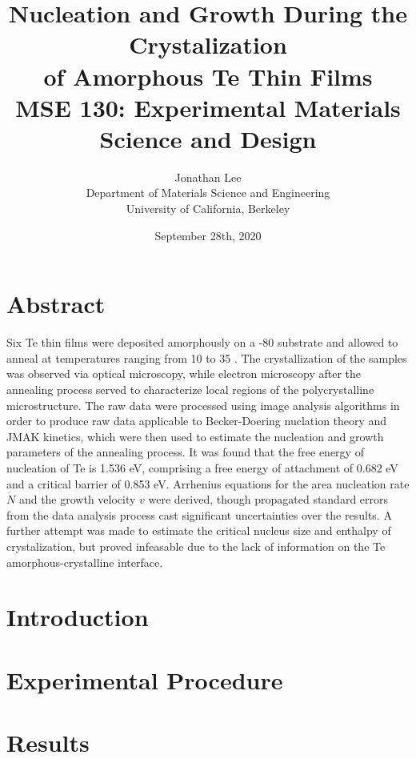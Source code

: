 \documentclass[12pt, titlepage]{article}
\title{\Large Nucleation and Growth During the Crystalization \\
		of Amorphous Te Thin Films \\
		\bigskip
	\normalsize MSE 130: Experimental Materials Science and Design}
\author{\normalsize Jonathan Lee \\
	\normalsize Department of Materials Science and Engineering \\
	\normalsize University of California, Berkeley}
\date{\normalsize September 28th, 2020}
\begin{document}
\maketitle

\doublespacing

\setcounter{page}{2}

\tableofcontents

\newpage

\section{Abstract}

Six Te thin films were deposited amorphously on a -80  substrate and allowed to anneal at temperatures ranging from 10  to 35 .  The crystallization of the samples was observed via optical microscopy, while electron microscopy after the annealing process served to characterize local regions of the polycrystalline microstructure.  The raw data were processed using image analysis algorithms in order to produce raw data applicable to Becker-Doering nuclation theory and JMAK kinetics, which were then used to estimate the nucleation and growth parameters of the annealing process.  It was found that the free energy of nucleation of Te is 1.536 eV, comprising a free energy of attachment of 0.682 eV and a critical barrier of 0.853 eV.  Arrhenius equations for the area nucleation rate $\dot{N}$ and the growth velocity $v$ were derived, though propagated standard errors from the data analysis process cast significant uncertainties over the results.  A further attempt was made to estimate the critical nucleus size and enthalpy of crystalization, but proved infeasable due to the lack of information on the Te amorphous-crystalline interface.

\section{Introduction}



\section{Experimental Procedure}



\section{Results}
\end{document}
